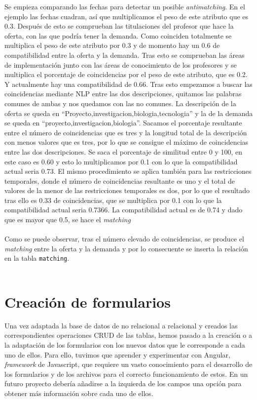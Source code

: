 \documentclass[11pt]{book}
\begin{document}
	Se empieza comparando las fechas para detectar un posible \emph{antimatching}. En el ejemplo las fechas cuadran, así que multiplicamos el peso de este atributo que es 0.3. Después de esto se comprueban las titulaciones del profesor que hace la oferta, con las que podría tener la demanda. Como coinciden totalmente se multiplica el peso de este atributo por 0.3 y de momento hay un 0.6 de compatibilidad entre la oferta y la demanda. Tras esto se comprueban las áreas de implementación junto con las áreas de conocimiento de los profesores y se multiplica el porcentaje de coincidencias por el peso de este atributo, que es 0.2. Y actualmente hay una compatibilidad de 0.66. Tras esto empezamos a buscar las coincidencias mediante NLP entre las dos descripciones, quitamos las palabras comunes de ambas y nos quedamos con las no comunes. La descripción de la oferta se queda en ``Proyecto,investigacion,biologia,tecnologia'' y la de la demanda se queda en ``proyecto,investigacion,biologia''. Sacamos el porcentaje resultante entre el número de coincidencias que es tres y la longitud total de la descripción con menos valores que es tres, por lo que se consigue el máximo de coincidencias entre las dos descripciones. Se saca el porcentaje de similitud entre 0 y 100, en este caso es 0.60 y esto lo multiplicamos por 0.1 con lo que la compatibilidad actual seria 0.73. El mismo procedimiento se aplica también para las restricciones temporales, donde el número de coincidencias resultante es uno y el total de valores de la menor de las restricciones temporales es dos, por lo que el resultado tras ello es 0.33 de coincidencias, que se multiplica por 0.1 con lo que la compatibilidad actual seria 0.7366. La compatibilidad actual es de 0.74 y dado que es mayor que 0.5, se hace el \emph{matching}\\\\
	Como se puede observar, tras el número elevado de coincidencias, se produce el \emph{matching} entre la oferta y la demanda y por lo consecuente se inserta la relación en la tabla \texttt{matching}.\\\\	
	
	\chapter{Creación de formularios}\label{cap:formularios}
	Una vez adaptada la base de datos de no relacional a relacional y creados las correspondientes operaciones CRUD de las tablas, hemos pasado a la creación o a la adaptación de los formularios con los nuevos datos que le corresponde a cada uno de ellos. Para ello, tuvimos que aprender y experimentar con Angular, \emph{framework} de Javascript, que requiere un vasto conocimiento para el desarrollo de los formularios y de los archivos para el correcto funcionamiento de estos. En un futuro proyecto debería añadirse a la izquierda de los campos una opción para obtener más información sobre cada uno de ellos.
\end{document}
